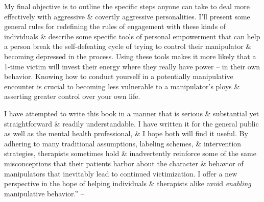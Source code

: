\documentclass{article}
\numberwithin{equation}{section}
\begin{document}
My final objective is to outline the specific steps anyone can take to deal more effectively with aggressive \& covertly aggressive personalities. I'll present some general rules for redefining the rules of engagement with these kinds of individuals \& describe some specific tools of personal empowerment that can help a person break the self-defeating cycle of trying to control their manipulator \& becoming depressed in the process. Using these tools makes it more likely that a 1-time victim will invest their energy where they really have power -- in their own behavior. Knowing how to conduct yourself in a potentially manipulative encounter is crucial to becoming less vulnerable to a manipulator's ploys \& asserting greater control over your own life.

I have attempted to write this book in a manner that is serious \& substantial yet straightforward \& readily understandable. I have written it for the general public as well as the mental health professional, \& I hope both will find it useful. By adhering to many traditional assumptions, labeling schemes, \& intervention strategies, therapists sometimes hold \& inadvertently reinforce some of the same misconceptions that their patients harbor about the character \& behavior of manipulators that inevitably lead to continued victimization. I offer a new perspective in the hope of helping individuals \& therapists alike avoid \textit{enabling} manipulative behavior.'' -- \cite[pp. 8--12]{Simon2010}

\end{document}
